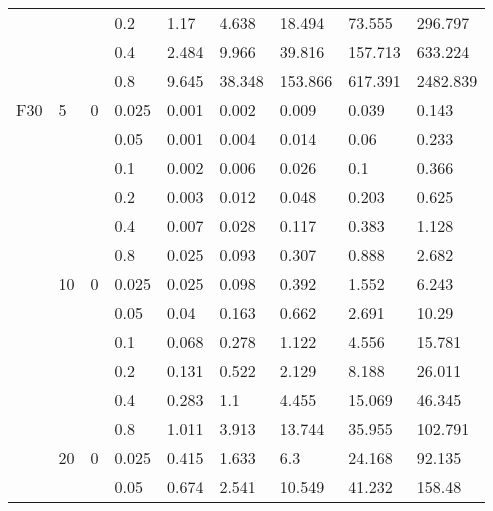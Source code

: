 \begin{longtable}{|l|l|l|l|l|l|l|l|l|}
\cmidrule{4-9} &     &          & 0.2            & 1.17       & 4.638      & 18.494     & 73.555     & 296.797    \\
\cmidrule{4-9} &     &          & 0.4            & 2.484      & 9.966      & 39.816     & 157.713    & 633.224    \\
\cmidrule{4-9} &     &          & 0.8            & 9.645      & 38.348     & 153.866    & 617.391    & 2482.839   \\ \midrule
F30            & 5   & 0        & 0.025          & 0.001      & 0.002      & 0.009      & 0.039      & 0.143      \\
\cmidrule{4-9} &     &          & 0.05           & 0.001      & 0.004      & 0.014      & 0.06       & 0.233      \\
\cmidrule{4-9} &     &          & 0.1            & 0.002      & 0.006      & 0.026      & 0.1        & 0.366      \\
\cmidrule{4-9} &     &          & 0.2            & 0.003      & 0.012      & 0.048      & 0.203      & 0.625      \\
\cmidrule{4-9} &     &          & 0.4            & 0.007      & 0.028      & 0.117      & 0.383      & 1.128      \\
\cmidrule{4-9} &     &          & 0.8            & 0.025      & 0.093      & 0.307      & 0.888      & 2.682      \\
\cmidrule{2-9} & 10  & 0        & 0.025          & 0.025      & 0.098      & 0.392      & 1.552      & 6.243      \\
\cmidrule{4-9} &     &          & 0.05           & 0.04       & 0.163      & 0.662      & 2.691      & 10.29      \\
\cmidrule{4-9} &     &          & 0.1            & 0.068      & 0.278      & 1.122      & 4.556      & 15.781     \\
\cmidrule{4-9} &     &          & 0.2            & 0.131      & 0.522      & 2.129      & 8.188      & 26.011     \\
\cmidrule{4-9} &     &          & 0.4            & 0.283      & 1.1        & 4.455      & 15.069     & 46.345     \\
\cmidrule{4-9} &     &          & 0.8            & 1.011      & 3.913      & 13.744     & 35.955     & 102.791    \\
\cmidrule{2-9} & 20  & 0        & 0.025          & 0.415      & 1.633      & 6.3        & 24.168     & 92.135     \\
\cmidrule{4-9} &     &          & 0.05           & 0.674      & 2.541      & 10.549     & 41.232     & 158.48     \\

\end{longtable}
